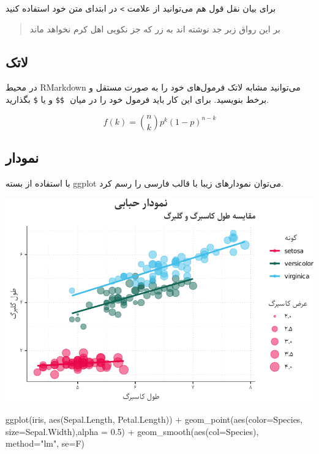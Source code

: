 \documentclass[
]{article}
\newenvironment{Shaded}{\begin{snugshade}}{\end{snugshade}}
\newcommand{\AttributeTok}[1]{\textcolor[rgb]{0.77,0.63,0.00}{#1}}
\newcommand{\FloatTok}[1]{\textcolor[rgb]{0.00,0.00,0.81}{#1}}
\newcommand{\FunctionTok}[1]{\textcolor[rgb]{0.00,0.00,0.00}{#1}}
\newcommand{\NormalTok}[1]{#1}
\newcommand{\SpecialCharTok}[1]{\textcolor[rgb]{0.00,0.00,0.00}{#1}}
\newcommand{\StringTok}[1]{\textcolor[rgb]{0.31,0.60,0.02}{#1}}
\begin{document}
برای بیان نقل قول هم می‌توانید از علامت \texttt{\textgreater{}} در
ابتدای متن خود استفاده کنید

\begin{quote}
بر این رواق زبر جد نوشته اند به زر که جز نکویی اهل کرم نخواهد ماند
\end{quote}

\hypertarget{ux644ux627ux62aux6a9}{%
\subsection{لاتک}\label{ux644ux627ux62aux6a9}}

در محیط RMarkdown می‌توانید مشابه لاتک فرمول‌های خود را به صورت مستقل و
برخط بنویسید. برای این‌ کار باید فرمول خود را در میان ‍‍ ‍‍\texttt{\$\$}
و یا \texttt{\$} بگذارید.

\[f\left(k\right)=\binom{n}{k}p^k\left(1-p\right)^{n-k}\]

\hypertarget{ux646ux645ux648ux62fux627ux631}{%
\subsection{نمودار}\label{ux646ux645ux648ux62fux627ux631}}

با استفاده از بسته ggplot می‌توان نمودارهای زیبا با قالب فارسی را رسم
کرد.

\begin{center}\includegraphics{figure/scatterPlot-1} \end{center}

\begin{Shaded}
\begin{Highlighting}[]
\FunctionTok{ggplot}\NormalTok{(iris, }\FunctionTok{aes}\NormalTok{(Sepal.Length, Petal.Length)) }\SpecialCharTok{+} 
  \FunctionTok{geom\_point}\NormalTok{(}\FunctionTok{aes}\NormalTok{(}\AttributeTok{color=}\NormalTok{Species, }\AttributeTok{size=}\NormalTok{Sepal.Width),}\AttributeTok{alpha =} \FloatTok{0.5}\NormalTok{) }\SpecialCharTok{+}
  \FunctionTok{geom\_smooth}\NormalTok{(}\FunctionTok{aes}\NormalTok{(}\AttributeTok{col=}\NormalTok{Species), }\AttributeTok{method=}\StringTok{"lm"}\NormalTok{, }\AttributeTok{se=}\NormalTok{F)}
\end{Highlighting}
\end{Shaded}
\end{document}
